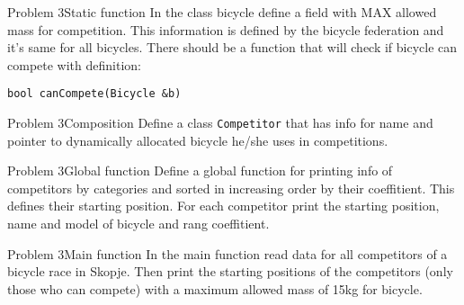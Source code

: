 \begin{frame}{Problem 3}{Static function}
In the class bicycle define a field with MAX allowed mass for competition. This
information is defined by the bicycle federation and it's same for all bicycles.
There should be a function that will check if bicycle can compete with
definition:

\texttt{bool canCompete(Bicycle \&b)}
\end{frame}

\begin{frame}{Problem 3}{Composition}
Define a class \texttt{Competitor} that has info for name and pointer to
dynamically allocated bicycle he/she uses in competitions.
\end{frame}

\begin{frame}{Problem 3}{Global function}
Define a global function for printing info of competitors by categories and
sorted in increasing order by their coeffitient. This defines their starting
position. For each competitor print the starting position, name and model of
bicycle and rang coeffitient.
\end{frame}

\begin{frame}{Problem 3}{Main function}
In the main function read data for all competitors of a bicycle race in Skopje.
Then print the starting positions of the competitors (only those who can
compete) with a maximum allowed mass of 15kg for bicycle.

\end{frame}
